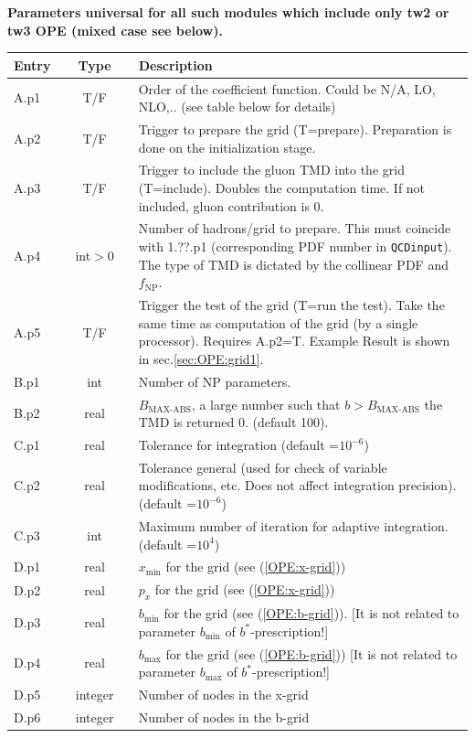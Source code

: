 \documentclass[prd,nofootinbib,eqsecnum,final]{revtex4}
\renewcommand{\(}{\left(}
\renewcommand{\)}{\right)}
\renewcommand{\[}{\left[}
\renewcommand{\]}{\right]}
\begin{document}
\begin{center}
\textbf{Parameters universal for all such modules which include only tw2 or tw3 OPE (mixed case see below).} 
\\
\begin{tabular}{||p{1.5cm}||c||p{12.5cm}||}
\hline\hline
Entry &~~Type~~& Description
\\\hline
A.p1 & T/F & Order of the coefficient function. Could be N/A, LO, NLO,.. (see table below for details)
\\\hline
A.p2 & T/F & Trigger to prepare the grid (T=prepare). Preparation is done on the initialization stage.
\\\hline
A.p3 & T/F & Trigger to include the gluon TMD into the grid (T=include). Doubles the computation time. If not included, gluon contribution is $0$.
\\\hline
A.p4 & int$>$0 & Number of hadrons/grid to prepare. This must coincide with 1.??.p1 (corresponding PDF number in \texttt{QCDinput}). The type of TMD is dictated by the collinear PDF and $f_{\text{NP}}$.
\\\hline
A.p5 & T/F & Trigger the test of the grid (T=run the test). Take the same time as computation of the grid (by a single processor). Requires A.p2=T. Example Result is shown in sec.\ref{sec:OPE:grid1}. 
\\\hline\hline
B.p1 & int & Number of NP parameters.
\\\hline
B.p2 & real & $B_{\text{MAX-ABS}}$, a large number such that $b>B_{\text{MAX-ABS}}$ the TMD is returned 0. (default 100).
\\\hline\hline
C.p1 & real & Tolerance for integration (default =$10^{-6}$)
\\\hline
C.p2 & real & Tolerance general (used for check of variable modifications, etc. Does not affect integration precision). (default =$10^{-6}$)
\\\hline
C.p3 & int & Maximum number of iteration for adaptive integration. (default =$10^{4}$)
\\\hline\hline
D.p1 & real & $x_{\text{min}}$ for the grid (see (\ref{OPE:x-grid}))
\\\hline
D.p2 & real & $p_x$ for the grid (see (\ref{OPE:x-grid}))
\\\hline
D.p3 & real & $b_{\text{min}}$ for the grid (see (\ref{OPE:b-grid})). [It is not related to parameter $b_{\min}$ of $b^*$-prescription!]
\\\hline
D.p4 & real & $b_{\max}$ for the grid (see (\ref{OPE:b-grid})) [It is not related to parameter $b_{\max}$ of $b^*$-prescription!]
\\\hline
D.p5 & integer & Number of nodes in the x-grid
\\\hline
D.p6 & integer & Number of nodes in the b-grid
\\
\hline\hline
\end{tabular}
\end{center}
\end{document}

